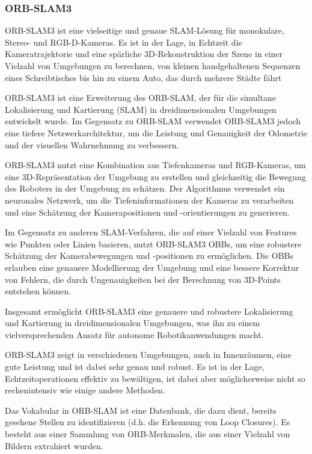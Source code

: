 \subsubsection{ORB-SLAM3}

ORB-SLAM3 ist eine vielseitige und genaue \ac{SLAM}-Lösung für monokulare, Stereo- und \ac{RGB-D}-Kameras. Es ist in der Lage, in Echtzeit die Kameratrajektorie und eine spärliche 3D-Rekonstruktion der Szene in einer Vielzahl von Umgebungen zu berechnen, von kleinen handgehaltenen Sequenzen eines Schreibtisches bis hin zu einem Auto, das durch mehrere Städte fährt

ORB-SLAM3 ist eine Erweiterung des ORB-SLAM, der für die simultane Lokalisierung und Kartierung (SLAM) in dreidimensionalen Umgebungen entwickelt wurde. Im Gegensatz zu ORB-SLAM verwendet ORB-SLAM3 jedoch eine tiefere Netzwerkarchitektur, um die Leistung und Genauigkeit der Odometrie und der visuellen Wahrnehmung zu verbessern.

ORB-SLAM3 nutzt eine Kombination aus Tiefenkameras und RGB-Kameras, um eine 3D-Repräsentation der Umgebung zu erstellen und gleichzeitig die Bewegung des Roboters in der Umgebung zu schätzen. Der Algorithmus verwendet ein neuronales Netzwerk, um die Tiefeninformationen der Kameras zu verarbeiten und eine Schätzung der Kamerapositionen und -orientierungen zu generieren.

Im Gegensatz zu anderen \ac{SLAM}-Verfahren, die auf einer Vielzahl von Features wie Punkten oder Linien basieren, nutzt ORB-SLAM3 \ac{OBBs}, um eine robustere Schätzung der Kamerabewegungen und -positionen zu ermöglichen. Die \ac{OBBs} erlauben eine genauere Modellierung der Umgebung und eine bessere Korrektur von Fehlern, die durch Ungenauigkeiten bei der Berechnung von 3D-Points entstehen können.

Insgesamt ermöglicht ORB-SLAM3 eine genauere und robustere Lokalisierung und Kartierung in dreidimensionalen Umgebungen, was ihn zu einem vielversprechenden Ansatz für autonome Robotikanwendungen macht.

ORB-SLAM3 zeigt in verschiedenen Umgebungen, auch in Innenräumen, eine gute Leistung und ist dabei sehr genau und robust. Es ist in der Lage, Echtzeitoperationen effektiv zu bewältigen, ist dabei aber möglicherweise nicht so rechenintensiv wie einige andere Methoden.

Das Vokabular in ORB-SLAM ist eine Datenbank, die dazu dient, bereits gesehene Stellen zu identifizieren (d.h. die Erkennung von Loop Closures). Es besteht aus einer Sammlung von ORB-Merkmalen, die aus einer Vielzahl von Bildern extrahiert wurden.

